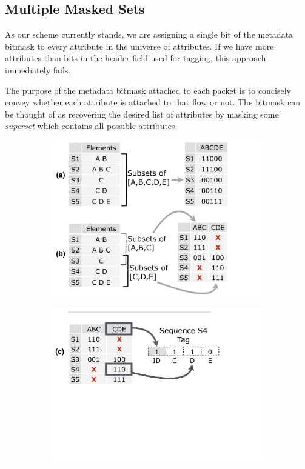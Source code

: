 \subsection{Multiple Masked Sets}

 As our scheme currently stands, we are assigning a single bit of the metadata bitmask to every
attribute in the universe of attributes. If we have more attributes than bits in the header field used for tagging, this approach immediately fails.

The purpose of the metadata bitmask attached to each packet is to concisely convey whether each attribute is attached to that flow or not. The bitmask can be thought of as recovering the desired list of attributes by masking some \textit{superset} which contains all possible attributes. 

\begin{figure}[t!] 
\begin{minipage}{1\linewidth}
\begin{subfigure}[b]{0.96\linewidth}
\includegraphics[trim={0 0 5.5cm 0}, clip, width=\linewidth]{figures/masking}
\end{subfigure} 
\begin{subfigure}[c]{0.96\linewidth}
\includegraphics[trim={0 13cm 5.5cm 0}, clip, width=\linewidth]{figures/making_metadata}

\end{subfigure}
\end{minipage}
\end{figure}
